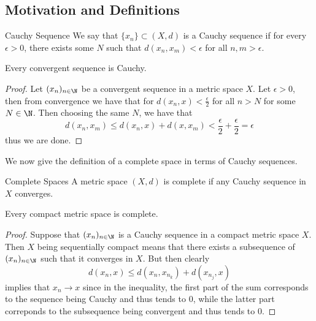 \subsection{Motivation and Definitions}
\begin{defn}{Cauchy Sequence}{} We say that $\{x_n\}\subset(X,d)$ is a Cauchy sequence if for every $\epsilon>0$, there exists some $N$ such that $d(x_n,x_m)<\epsilon$ for all $n,m>\epsilon$. 
\end{defn}

\begin{prp}{}{} Every convergent sequence is Cauchy. \tcbline
\begin{proof}
Let $(x_n)_{n\in\N}$ be a convergent sequence in a metric space $X$. Let $\epsilon>0$, then from convergence we have that for $d(x_n,x)<\frac{\epsilon}{2}$ for all $n>N$ for some $N\in\N$. Then choosing the same $N$, we have that $$d(x_n,x_m)\leq d(x_n,x)+d(x,x_m)<\frac{\epsilon}{2}+\frac{\epsilon}{2}=\epsilon$$ thus we are done. 
\end{proof}
\end{prp}

We now give the definition of a complete space in terms of Cauchy sequences. 

\begin{defn}{Complete Spaces}{} A metric space $(X,d)$ is complete if any Cauchy sequence in $X$ converges. 
\end{defn}

\begin{prp}{}{} Every compact metric space is complete. \tcbline
\begin{proof}
Suppose that $(x_n)_{n\in\N}$ is a Cauchy sequence in a compact metric space $X$. Then $X$ being sequentially compact means that there exists a subsequence of $(x_n)_{n\in\N}$ such that it converges in $X$. But then clearly $$d(x_n,x)\leq d(x_n,x_{n_k})+d(x_{n_j},x)$$ implies that $x_n\to x$ since in the inequality, the first part of the sum corresponds to the sequence being Cauchy and thus tends to $0$, while the latter part correponds to the subsequence being convergent and thus tends to $0$. 
\end{proof}
\end{prp}

